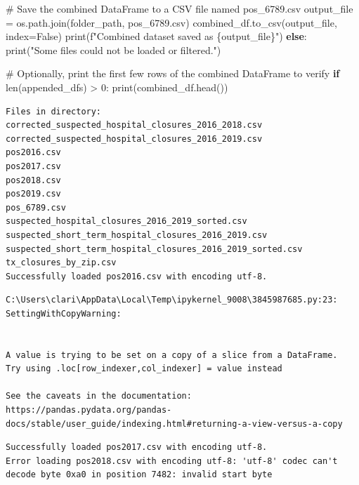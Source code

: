 \documentclass[
  letterpaper,
  DIV=11,
  numbers=noendperiod]{scrartcl}
\newenvironment{Shaded}{\begin{snugshade}}{\end{snugshade}}
\newcommand{\BuiltInTok}[1]{\textcolor[rgb]{0.00,0.23,0.31}{#1}}
\newcommand{\CommentTok}[1]{\textcolor[rgb]{0.37,0.37,0.37}{#1}}
\newcommand{\ControlFlowTok}[1]{\textcolor[rgb]{0.00,0.23,0.31}{\textbf{#1}}}
\newcommand{\DecValTok}[1]{\textcolor[rgb]{0.68,0.00,0.00}{#1}}
\newcommand{\NormalTok}[1]{\textcolor[rgb]{0.00,0.23,0.31}{#1}}
\newcommand{\OperatorTok}[1]{\textcolor[rgb]{0.37,0.37,0.37}{#1}}
\newcommand{\SpecialCharTok}[1]{\textcolor[rgb]{0.37,0.37,0.37}{#1}}
\newcommand{\SpecialStringTok}[1]{\textcolor[rgb]{0.13,0.47,0.30}{#1}}
\newcommand{\StringTok}[1]{\textcolor[rgb]{0.13,0.47,0.30}{#1}}
\newcommand{\VariableTok}[1]{\textcolor[rgb]{0.07,0.07,0.07}{#1}}
\begin{document}
\begin{Shaded}
\begin{Highlighting}[]
    \CommentTok{\# Save the combined DataFrame to a CSV file named \textquotesingle{}pos\_6789.csv\textquotesingle{}}
\NormalTok{    output\_file }\OperatorTok{=}\NormalTok{ os.path.join(folder\_path, }\StringTok{\textquotesingle{}pos\_6789.csv\textquotesingle{}}\NormalTok{)}
\NormalTok{    combined\_df.to\_csv(output\_file, index}\OperatorTok{=}\VariableTok{False}\NormalTok{)}
    \BuiltInTok{print}\NormalTok{(}\SpecialStringTok{f"Combined dataset saved as }\SpecialCharTok{\{}\NormalTok{output\_file}\SpecialCharTok{\}}\SpecialStringTok{"}\NormalTok{)}
\ControlFlowTok{else}\NormalTok{:}
    \BuiltInTok{print}\NormalTok{(}\StringTok{"Some files could not be loaded or filtered."}\NormalTok{)}

\CommentTok{\# Optionally, print the first few rows of the combined DataFrame to verify}
\ControlFlowTok{if} \BuiltInTok{len}\NormalTok{(appended\_dfs) }\OperatorTok{\textgreater{}} \DecValTok{0}\NormalTok{:}
    \BuiltInTok{print}\NormalTok{(combined\_df.head())}
\end{Highlighting}
\end{Shaded}

\begin{verbatim}
Files in directory:
corrected_suspected_hospital_closures_2016_2018.csv
corrected_suspected_hospital_closures_2016_2019.csv
pos2016.csv
pos2017.csv
pos2018.csv
pos2019.csv
pos_6789.csv
suspected_hospital_closures_2016_2019_sorted.csv
suspected_short_term_hospital_closures_2016_2019.csv
suspected_short_term_hospital_closures_2016_2019_sorted.csv
tx_closures_by_zip.csv
Successfully loaded pos2016.csv with encoding utf-8.
\end{verbatim}

\begin{verbatim}
C:\Users\clari\AppData\Local\Temp\ipykernel_9008\3845987685.py:23: SettingWithCopyWarning:


A value is trying to be set on a copy of a slice from a DataFrame.
Try using .loc[row_indexer,col_indexer] = value instead

See the caveats in the documentation: https://pandas.pydata.org/pandas-docs/stable/user_guide/indexing.html#returning-a-view-versus-a-copy
\end{verbatim}

\begin{verbatim}
Successfully loaded pos2017.csv with encoding utf-8.
Error loading pos2018.csv with encoding utf-8: 'utf-8' codec can't decode byte 0xa0 in position 7482: invalid start byte
\end{verbatim}
\end{document}
